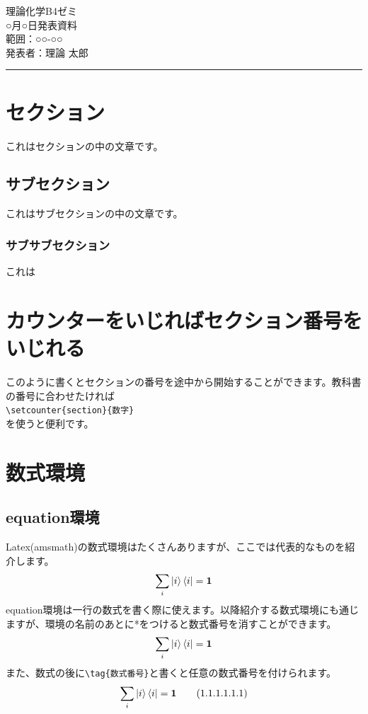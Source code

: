 \documentclass[paper=a4, fontsize=10pt]{jlreq}
\begin{document}
\begin{center}
    {\LARGE 理論化学B4ゼミ\\○月○日発表資料}\\
    {\large 範囲：○○-○○}\\
    {\large 発表者：理論 太郎}\\
\end{center}
\hspace{10pt}
\hrule
\hspace{10pt}
\section{セクション}
これはセクションの中の文章です。
\subsection{サブセクション}
これはサブセクションの中の文章です。
\subsubsection{サブサブセクション}
これは

\setcounter{section}{2}
\section{カウンターをいじればセクション番号をいじれる}
このように書くとセクションの番号を途中から開始することができます。教科書の番号に合わせたければ\\
\verb|\setcounter{section}{数字}|\\
を使うと便利です。

\section{数式環境}
\subsection{equation環境}
Latex(amsmath)の数式環境はたくさんありますが、ここでは代表的なものを紹介します。
\begin{equation}
    \sum_{i}\ket{i}\bra{i} = \bm{1}
\end{equation}
equation環境は一行の数式を書く際に使えます。以降紹介する数式環境にも通じますが、環境の名前のあとに*をつけると数式番号を消すことができます。
\begin{equation*}
    \sum_{i}\ket{i}\bra{i} = \bm{1}
\end{equation*}
また、数式の後に\verb|\tag{数式番号}|と書くと任意の数式番号を付けられます。
\begin{equation}
    \sum_{i}\ket{i}\bra{i} = \bm{1} \tag{1.1.1.1.1.1}
\end{equation}
\end{document}
